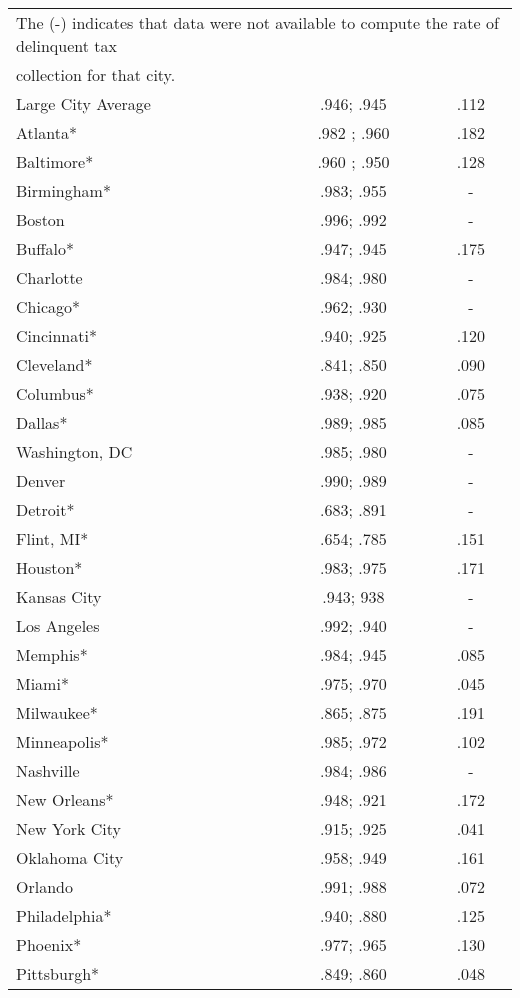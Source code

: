 \documentclass[12pt,titlepage]{article}
\begin{document}
\begin{center}
\begin{longtable}{| l | c |  c|}
\multicolumn{3}{l}{The (-) indicates that data were not available to compute the rate of delinquent tax} \\
\multicolumn{3}{l}{collection for that city.}  \\
\endlastfoot
Large City Average & .946; .945	& .112 \\
Atlanta*	  & .982 ;  .960 & .182 \\
Baltimore*	 & .960 ;  .950	 & .128 \\
Birmingham*	 & .983;  .955	& - \\
Boston	         & .996;  .992	 & - \\
Buffalo*	 & .947;  .945	 & .175 \\
Charlotte	 & .984;  .980	 & - \\
Chicago*	 & .962;  .930	 & - \\
Cincinnati*	 & .940;  .925	 & .120 \\
Cleveland*	 & .841;  .850	 & .090 \\
Columbus*	 & .938;  .920	 & .075 \\
Dallas*	         & .989;  .985	 & .085 \\
Washington, DC	 & .985;  .980	 & - \\
Denver	         & .990;  .989	 & - \\
Detroit*	 & .683;  .891	 & - \\
Flint, MI*	         & .654;  .785	 & .151 \\
Houston*	 & .983;  .975	 & .171 \\
Kansas City	 & .943; 938	 & - \\
Los Angeles	 & .992;  .940	 & - \\
Memphis*	 & .984;  .945	 & .085 \\
Miami*	         & .975;  .970	 & .045 \\
Milwaukee*	 & .865;  .875	 & .191 \\
Minneapolis*	 & .985;  .972	 & .102 \\
Nashville	 & .984;  .986	 & - \\
New Orleans*	 & .948;  .921	 & .172 \\
New York City	 & .915;  .925	 & .041 \\
Oklahoma City	 & .958;  .949	 & .161 \\
Orlando	         & .991;  .988	 & .072 \\
Philadelphia*	 & .940;  .880	 & .125 \\
Phoenix*	 & .977;  .965	 & .130 \\
Pittsburgh*	 & .849;  .860	 & .048 \\

\end{longtable}
\end{center}
\end{document}
